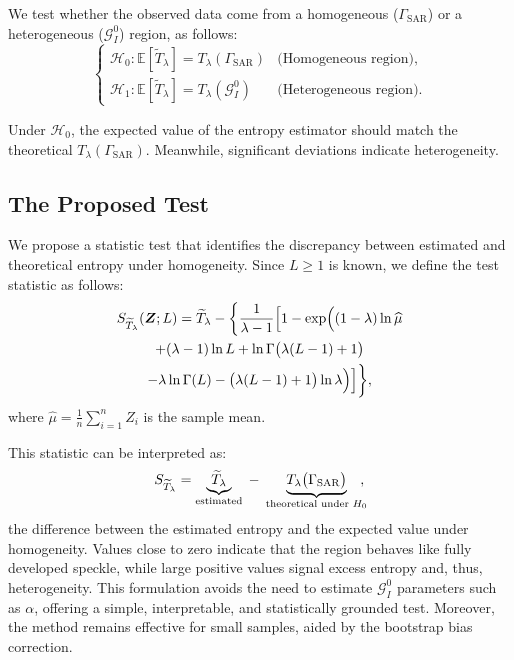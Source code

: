 \documentclass[
  lettersize  journal,
]{IEEEtran}%
\begin{document}
We test whether the observed data come from a homogeneous
(\(\Gamma_{\text{SAR}}\)) or a heterogeneous (\(\mathcal{G}^0_I\))
region, as follows: \begin{equation}\label{eq:hypothesis_test}
\begin{cases}
\mathcal{H}_0: \mathbb{E}[\widetilde{T}_{\lambda}] = T_{\lambda}(\Gamma_{\text{SAR}}) & \text{(Homogeneous region)}, \\[6pt]
\mathcal{H}_1: \mathbb{E}[\widetilde{T}_{\lambda}] = T_{\lambda}(\mathcal{G}^0_I) & \text{(Heterogeneous region)}.
\end{cases}
\end{equation}

Under \(\mathcal{H}_0\), the expected value of the entropy estimator
should match the theoretical \(T_{\lambda}(\Gamma_{\text{SAR}})\).
Meanwhile, significant deviations indicate heterogeneity.

\subsection{The Proposed Test}\label{the-proposed-test}

We propose a statistic test that identifies the discrepancy between
estimated and theoretical entropy under homogeneity. Since \(L\geq1\) is
known, we define the test statistic as follows: \begin{multline}
\label{eq-test-tsallis}
S_{\widetilde{T}_{\lambda}}(\bm{Z}; L) = \widetilde{T}_{\lambda} - \biggl\{ \frac{1}{\lambda - 1} \Bigl[ 1 -
\exp\Bigl(
(1 - \lambda)\ln \widehat{\mu}\\
+ (\lambda - 1)\ln L
+ \ln\Gamma\bigl(\lambda(L - 1) + 1\bigr) \\
- \lambda\ln\Gamma(L)
- \bigl(\lambda(L - 1) + 1\bigr)\ln \lambda
\Bigr) \Bigr] \biggr\},
\end{multline} where \(\widehat{\mu} = \frac{1}{n} \sum_{i=1}^n Z_i\) is
the sample mean.

This statistic can be interpreted as: \[
S_{\widetilde T_\lambda} 
= 
\underbrace{\widetilde T_\lambda}_{\text{estimated}} 
\;-\;
\underbrace{T_\lambda\bigl(\Gamma_{\mathrm{SAR}}\bigr)}_{\text{theoretical under } H_0}\hspace{-0.5em},
\] the difference between the estimated entropy and the expected value
under homogeneity. Values close to zero indicate that the region behaves
like fully developed speckle, while large positive values signal excess
entropy and, thus, heterogeneity. This formulation avoids the need to
estimate \(\mathcal{G}^0_I\) parameters such as \(\alpha\), offering a
simple, interpretable, and statistically grounded test. Moreover, the
method remains effective for small samples, aided by the bootstrap bias
correction.
\end{document}

